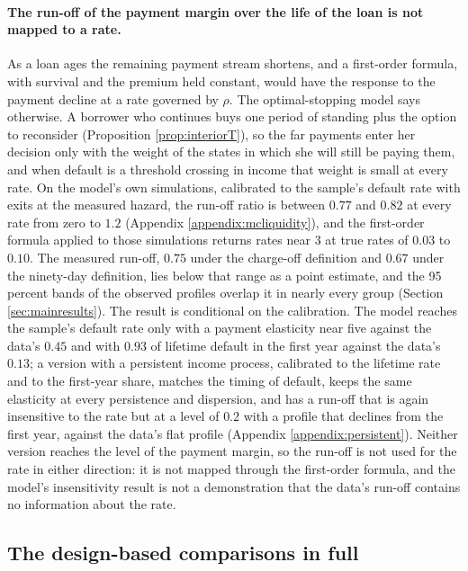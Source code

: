\paragraph{The run-off of the payment margin over the life of the loan is not mapped to a rate.} As a loan ages the remaining payment stream shortens, and a first-order formula, with survival and the premium held constant, would have the response to the payment decline at a rate governed by $\rho$. The optimal-stopping model says otherwise. A borrower who continues buys one period of standing plus the option to reconsider (Proposition \ref{prop:interiorT}), so the far payments enter her decision only with the weight of the states in which she will still be paying them, and when default is a threshold crossing in income that weight is small at every rate. On the model's own simulations, calibrated to the sample's default rate with exits at the measured hazard, the run-off ratio is between $0.77$ and $0.82$ at every rate from zero to $1.2$ (Appendix \ref{appendix:mcliquidity}), and the first-order formula applied to those simulations returns rates near $3$ at true rates of $0.03$ to $0.10$. The measured run-off, $0.75$ under the charge-off definition and $0.67$ under the ninety-day definition, lies below that range as a point estimate, and the 95 percent bands of the observed profiles overlap it in nearly every group (Section \ref{sec:mainresults}). The result is conditional on the calibration. The model reaches the sample's default rate only with a payment elasticity near five against the data's $0.45$ and with $0.93$ of lifetime default in the first year against the data's $0.13$; a version with a persistent income process, calibrated to the lifetime rate and to the first-year share, matches the timing of default, keeps the same elasticity at every persistence and dispersion, and has a run-off that is again insensitive to the rate but at a level of $0.2$ with a profile that declines from the first year, against the data's flat profile (Appendix \ref{appendix:persistent}). Neither version reaches the level of the payment margin, so the run-off is not used for the rate in either direction: it is not mapped through the first-order formula, and the model's insensitivity result is not a demonstration that the data's run-off contains no information about the rate.

\subsection{The design-based comparisons in full}\label{appendix:strategies:designs}

